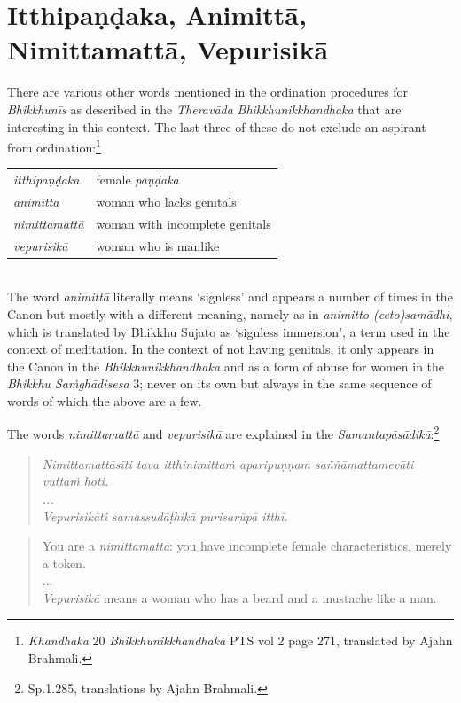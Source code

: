 \section{Itthipaṇḍaka, Animittā, Nimittamattā, Vepurisikā}

There are various other words mentioned in the ordination procedures for {\em Bhikkhunīs} as described in the {\em Theravāda} {\em Bhikkhunikkhandhaka} that are interesting in this context. The last three of these do not exclude an aspirant from ordination:\footnote{{\em Khandhaka} 20 {\em Bhikkhunikkhandhaka} PTS vol 2 page 271, translated by Ajahn Brahmali.} \\

\begin{tabular}{ l l }
 {\em itthipaṇḍaka} & female {\em paṇḍaka} \\
 {\em animittā } & woman who lacks genitals \\
 {\em nimittamattā } & woman with incomplete genitals \\ 
 {\em vepurisikā } & woman who is manlike \\
\end{tabular} \\

The word {\em animittā} literally means `signless' and appears a number of times in the Canon but mostly with a different meaning, namely as in {\em animitto (ceto)samādhi}, which is translated by Bhikkhu Sujato as `signless immersion', a term used in the context of meditation. In the context of not having genitals, it only appears in the Canon in the {\em Bhikkhunikkhandhaka} and as a form of abuse for women in the {\em Bhikkhu Saṁ­ghā­di­sesa­} 3; never on its own but always in the same sequence of words of which the above are a few.

The words {\em nimittamattā} and {\em vepurisikā} are explained in the {\em Samantapāsādikā}:\footnote{Sp.1.285, translations by Ajahn Brahmali.}
\begin{quote}
{\em Nimittamattāsīti tava itthinimittaṁ aparipuṇṇaṁ saññāmattamevāti vuttaṁ hoti.\\
...\\
Vepurisikāti samassudāṭhikā purisarūpā itthī.}
\end{quote}

\begin{quote}
You are a {\em nimittamattā}: you have incomplete female characteristics, merely a token.\\
...\\
{\em Vepurisikā} means a woman who has a beard and a mustache like a man.
\end{quote}

